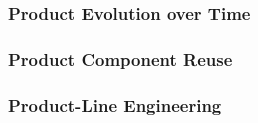 \documentclass[11pt]{article}
\begin{document}
\subsubsection{Product Evolution over Time}
%
%
\subsubsection{Product Component Reuse}
%
%
%
\subsubsection{Product-Line Engineering}
%
%
\end{document}
